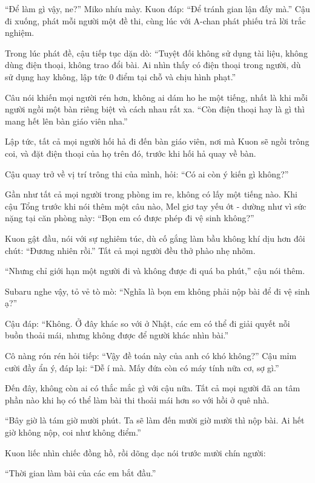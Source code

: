 \documentclass[../main.tex]{subfiles}
\begin{document}
``Để làm gì vậy, ne?'' Miko nhíu mày. Kuon đáp: ``Để tránh gian lận đấy mà.'' Cậu đi xuống, phát mỗi người một đề thi, cùng lúc với A-chan phát phiếu trả lời trắc nghiệm.

Trong lúc phát đề, cậu tiếp tục dặn dò: ``Tuyệt đối không sử dụng tài liệu, không dùng điện thoại, không trao đổi bài. Ai nhìn thấy có điện thoại trong người, dù sử dụng hay không, lập tức 0 điểm tại chỗ và chịu hình phạt.''

Câu nói khiến mọi người rén hơn, không ai dám ho he một tiếng, nhất là khi mỗi người ngồi một bàn riêng biệt và cách nhau rất xa. ``Còn điện thoại hay là gì thì mang hết lên bàn giáo viên nha.''

Lập tức, tất cả mọi người hối hả đi đến bàn giáo viên, nơi mà Kuon sẽ ngồi trông coi, và đặt điện thoại của họ trên đó, trước khi hối hả quay về bàn.

Cậu quay trở về vị trí trông thi của mình, hỏi: ``Có ai còn ý kiến gì không?''

Gần như tất cả mọi người trong phòng im re, không có lấy một tiếng nào. Khi cậu Tổng trước khi nói thêm một câu nào, Mel giơ tay yếu ớt - dường như vì sức nặng tại căn phòng này: ``Bọn em có được phép đi vệ sinh không?''

Kuon gật đầu, nói với sự nghiêm túc, dù cố gắng làm bầu không khí dịu hơn đôi chút: ``Đương nhiên rồi.'' Tất cả mọi người đều thở phào nhẹ nhõm.

``Nhưng chỉ giới hạn một người đi và không được đi quá ba phút,'' cậu nói thêm.

Subaru nghe vậy, tỏ vẻ tò mò: ``Nghĩa là bọn em không phải nộp bài để đi vệ sinh ạ?''

Cậu đáp: ``Không. Ở đây khác so với ở Nhật, các em có thể đi giải quyết nỗi buồn thoải mái, nhưng không được để người khác nhìn bài.''

Cô nàng rón rén hỏi tiếp: ``Vậy đề toán này của anh có khó không?'' Cậu mỉm cười đầy ẩn ý, đáp lại: ``Dễ í mà. Mấy đứa còn có máy tính nữa cơ, sợ gì.''

Đến đây, không còn ai có thắc mắc gì với cậu nữa. Tất cả mọi người đã an tâm phần nào khi họ có thể làm bài thi thoải mái hơn so với hồi ở quê nhà.

``Bây giờ là tám giờ mười phút. Ta sẽ làm đến mười giờ mười thì nộp bài. Ai hết giờ không nộp, coi như không điểm.''

Kuon liếc nhìn chiếc đồng hồ, rồi dõng dạc nói trước mười chín người:

\begin{center}
    ``Thời gian làm bài của các em bắt đầu.''
\end{center}
\end{document}
